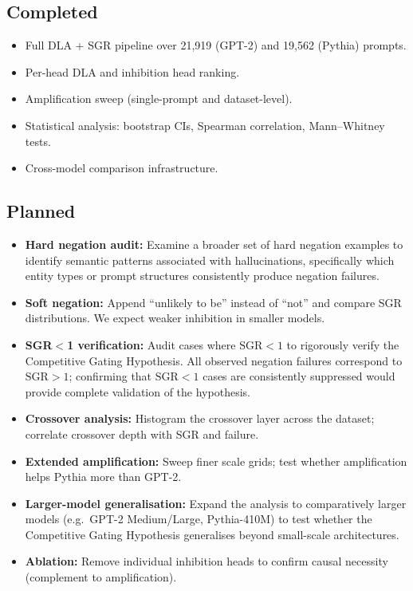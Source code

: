 \documentclass[11pt]{article}
\begin{document}
\subsection{Completed}
\begin{itemize}
\item Full DLA + SGR pipeline over 21,919 (GPT-2) and 19,562 (Pythia) prompts.
\item Per-head DLA and inhibition head ranking.
\item Amplification sweep (single-prompt and dataset-level).
\item Statistical analysis: bootstrap CIs, Spearman correlation, Mann--Whitney tests.
\item Cross-model comparison infrastructure.
\end{itemize}

\subsection{Planned}
\begin{itemize}
\item \textbf{Hard negation audit:}  Examine a broader set of hard
      negation examples to identify semantic patterns associated with
      hallucinations, specifically which entity types or prompt structures
      consistently produce negation failures.
\item \textbf{Soft negation:}  Append ``unlikely to be'' instead of ``not''
      and compare SGR distributions.  We expect weaker inhibition in
      smaller models.
\item \textbf{SGR${<}$1 verification:}  Audit cases where
      $\mathrm{SGR} < 1$ to rigorously verify the Competitive Gating
      Hypothesis.  All observed negation failures correspond to
      $\mathrm{SGR} > 1$; confirming that $\mathrm{SGR} < 1$ cases are
      consistently suppressed would provide complete validation of the
      hypothesis.
\item \textbf{Crossover analysis:}  Histogram the crossover layer across
      the dataset; correlate crossover depth with SGR and failure.
\item \textbf{Extended amplification:}  Sweep finer scale grids; test
      whether amplification helps Pythia more than GPT-2.
\item \textbf{Larger-model generalisation:}  Expand the analysis to
      comparatively larger models (e.g.\ GPT-2 Medium/Large,
      Pythia-410M) to test whether the Competitive Gating Hypothesis
      generalises beyond small-scale architectures.
\item \textbf{Ablation:}  Remove individual inhibition heads to confirm
      causal necessity (complement to amplification).
\end{itemize}
\end{document}
